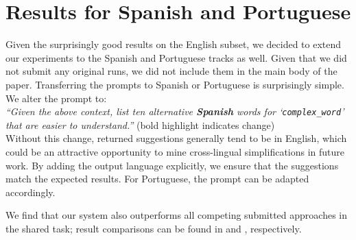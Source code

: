 \documentclass[11pt]{article}
\begin{document}
\section{Results for Spanish and Portuguese}
Given the surprisingly good results on the English subset, we decided to extend our experiments to the Spanish and Portuguese tracks as well. Given that we did not submit any original runs, we did not include them in the main body of the paper.
Transferring the prompts to Spanish or Portuguese is surprisingly simple. We alter the prompt to:\\
\emph{``Given the above context, list ten alternative \textbf{Spanish} words for `\texttt{complex\_word}' that are easier to understand.''} (bold highlight indicates change)\\
Without this change, returned suggestions generally tend to be in English, which could be an attractive opportunity to mine cross-lingual simplifications in future work. By adding the output language explicitly, we ensure that the suggestions match the expected results.
For Portuguese, the prompt can be adapted accordingly.

\noindent We find that our system also outperforms all competing submitted approaches in the shared task; result comparisons can be found in  and , respectively.
\end{document}
